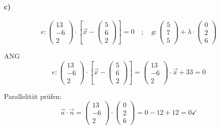 \documentclass{ajc}
\numberwithin{equation}{subsection}
\begin{document}
	\paragraph{c)}
	\begin{equation}
		e: \left(\begin{array}{r} 13 \\ -6 \\ 2\end{array}\right) \cdot \left[\vec{x} - \left(\begin{array}{r} 5 \\ 6 \\ 2\end{array}\right)\right] = 0 \quad ; \quad g: \left(\begin{array}{r} 5 \\ 7 \\ 5\end{array}\right) + \lambda \cdot \left(\begin{array}{r} 0 \\ 2 \\ 6\end{array}\right)
	\end{equation}
	
	ANG
	\begin{equation}
		e: \left(\begin{array}{r} 13 \\ -6 \\ 2\end{array}\right) \cdot \left[\vec{x} - \left(\begin{array}{r} 5 \\ 6 \\ 2\end{array}\right)\right] = \left(\begin{array}{r} 13 \\ -6 \\ 2\end{array}\right) \cdot \vec{x} + 33 = 0
	\end{equation}
	
	Parallelität prüfen:
	\begin{equation}
		\vec{u} \cdot \vec{n} = \left(\begin{array}{r} 13 \\ -6 \\ 2\end{array}\right) \cdot \left(\begin{array}{r} 0 \\ 2 \\ 6\end{array}\right) = 0 - 12 + 12 = 0 \checkmark
	\end{equation}
	
\end{document}
